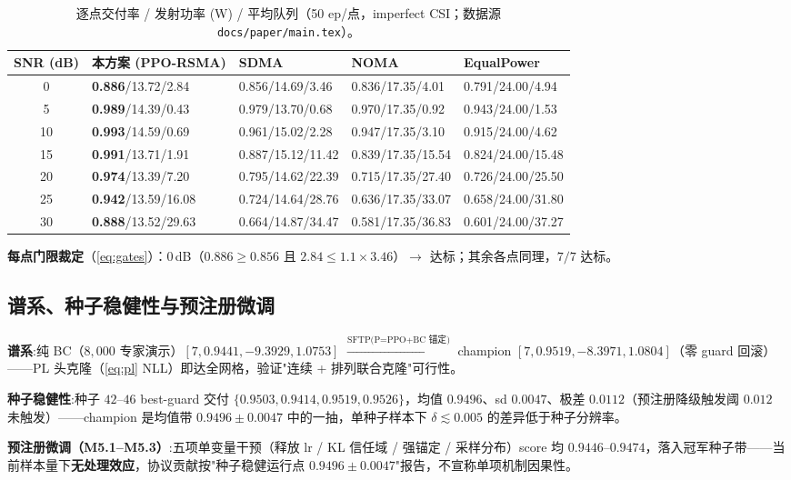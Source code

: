 \documentclass[UTF8,11pt,a4paper]{ctexart}
\theoremstyle{plain}
\theoremstyle{definition}
\theoremstyle{remark}
\begin{document}
\begin{table}[ht]
\centering
\caption{逐点交付率 / 发射功率 (W) / 平均队列（50 ep/点，imperfect CSI；数据源 \texttt{docs/paper/main.tex}）。}
\label{tab:bench}
\begin{tabular}{@{}c|l|l|l|l@{}}
\toprule
SNR (dB) & 本方案 (PPO-RSMA) & SDMA & NOMA & EqualPower \\
\midrule
0  & \textbf{0.886}/13.72/2.84 & 0.856/14.69/3.46 & 0.836/17.35/4.01 & 0.791/24.00/4.94 \\
5  & \textbf{0.989}/14.39/0.43 & 0.979/13.70/0.68 & 0.970/17.35/0.92 & 0.943/24.00/1.53 \\
10 & \textbf{0.993}/14.59/0.69 & 0.961/15.02/2.28 & 0.947/17.35/3.10 & 0.915/24.00/4.62 \\
15 & \textbf{0.991}/13.71/1.91 & 0.887/15.12/11.42 & 0.839/17.35/15.54 & 0.824/24.00/15.48 \\
20 & \textbf{0.974}/13.39/7.20 & 0.795/14.62/22.39 & 0.715/17.35/27.40 & 0.726/24.00/25.50 \\
25 & \textbf{0.942}/13.59/16.08 & 0.724/14.64/28.76 & 0.636/17.35/33.07 & 0.658/24.00/31.80 \\
30 & \textbf{0.888}/13.52/29.63 & 0.664/14.87/34.47 & 0.581/17.35/36.83 & 0.601/24.00/37.27 \\
\bottomrule
\end{tabular}
\end{table}

\noindent\textbf{每点门限裁定}（\eqref{eq:gates}）：$0$\,dB（$0.886\ge0.856$ 且 $2.84\le1.1\times3.46$）$\to$ 达标；其余各点同理，$7/7$ 达标。

\subsection{谱系、种子稳健性与预注册微调} \label{sec:results-seeds}

\textbf{谱系}:纯 BC（$8{,}000$ 专家演示）$[7,0.9441,-9.3929,1.0753]$ $\xrightarrow{\text{SFTP(P=PPO+BC 锚定)}}$ champion $[7,0.9519,-8.3971,1.0804]$（零 guard 回滚）——PL 头克隆（\eqref{eq:pl} NLL）即达全网格，验证"连续 + 排列联合克隆"可行性。

\textbf{种子稳健性}:种子 $42$--$46$ best-guard 交付 $\{0.9503,0.9414,0.9519,0.9526\}$，均值 $0.9496$、sd $0.0047$、极差 $0.0112$（预注册降级触发阈 $0.012$ 未触发）——champion 是均值带 $0.9496\pm0.0047$ 中的一抽，单种子样本下 $\delta\lesssim0.005$ 的差异低于种子分辨率。

\textbf{预注册微调（M5.1--M5.3）}:五项单变量干预（释放 lr / KL 信任域 / 强锚定 / 采样分布）score 均 $0.9446$--$0.9474$，落入冠军种子带——当前样本量下\textbf{无处理效应}，协议贡献按"种子稳健运行点 $0.9496\pm0.0047$"报告，不宣称单项机制因果性。
\end{document}
